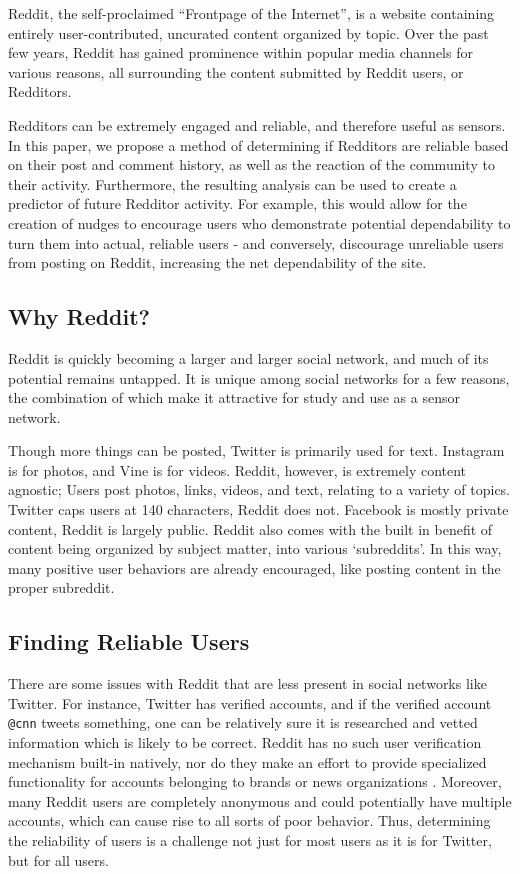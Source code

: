 Reddit, the self-proclaimed ``Frontpage of the Internet'', is a website
containing entirely user-contributed, uncurated content organized by topic. Over
the past few years, Reddit has gained prominence within popular media channels
for various reasons, all surrounding the content submitted by Reddit users, or
Redditors.

Redditors can be extremely engaged and reliable, and therefore useful as
sensors. In this paper, we propose a method of determining if Redditors are
reliable based on their post and comment history, as well as the reaction of the
community to their activity. Furthermore, the resulting analysis can be used to
create a predictor of future Redditor activity. For example, this would allow
for the creation of nudges to encourage users who demonstrate potential
dependability to turn them into actual, reliable users - and conversely,
discourage unreliable users from posting on Reddit, increasing the net
dependability of the site.

\subsection{Why Reddit?}
\label{sub:why_reddit}

Reddit is quickly becoming a larger and larger social network, and much of its
potential remains untapped. It is unique among social networks for a few
reasons, the combination of which make it attractive for study and use as a
sensor network.

Though more things can be posted, Twitter is primarily used for text. Instagram
is for photos, and Vine is for videos. Reddit, however, is extremely content
agnostic; Users post photos, links, videos, and text, relating to a variety of
topics. Twitter caps users at 140 characters, Reddit does not. Facebook is
mostly private content, Reddit is largely public. Reddit also comes with the
built in benefit of content being organized by subject matter, into various
`subreddits'. In this way, many positive user behaviors are already encouraged,
like posting content in the proper subreddit.


\subsection{Finding Reliable Users}
\label{sub:finding_reliable_users}

There are some issues with Reddit that are less present in social networks like
Twitter. For instance, Twitter has verified accounts, and if the verified
account \texttt{@cnn} tweets something, one can be relatively sure it is
researched and vetted information which is likely to be correct. Reddit has no
such user verification mechanism built-in natively, nor do they make an effort
to provide specialized functionality for accounts belonging to brands or news
organizations . Moreover, many Reddit users are completely anonymous and could
potentially have multiple accounts, which can cause rise to all sorts of poor
behavior. Thus, determining the reliability of users is a challenge not just for
most users as it is for Twitter, but for all users.

